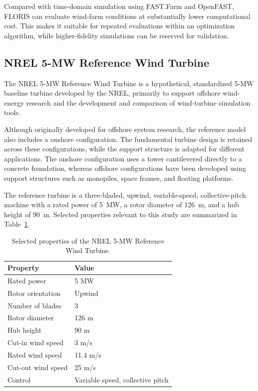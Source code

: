 \documentclass[11pt]{article}
\begin{document}
Compared with time-domain simulation using FAST.Farm and OpenFAST, FLORIS can evaluate wind-farm conditions at substantially lower computational cost. This makes it suitable for repeated evaluations within an optimization algorithm, while higher-fidelity simulations can be reserved for validation.



\subsection{NREL 5-MW Reference Wind Turbine}

The NREL 5-MW Reference Wind Turbine is a hypothetical, standardized 5-MW baseline turbine developed by the NREL, primarily to support offshore wind-energy research and the development and comparison of wind-turbine simulation tools.

Although originally developed for offshore system research, the reference model also includes a onshore configuration. The fundamental turbine design is retained across these configurations, while the support structure is adapted for different applications. The onshore configuration uses a tower cantilevered directly to a concrete foundation, whereas offshore configurations have been developed using support structures such as monopiles, space frames, and floating platforms.

The reference turbine is a three-bladed, upwind, variable-speed, collective-pitch machine with a rated power of 5~MW, a rotor diameter of 126~m, and a hub height of 90~m. Selected properties relevant to this study are summarized in Table~\ref{tab:nrel-5mw}.

\begin{table}[htbp]
    \centering
    \caption{Selected properties of the NREL 5-MW Reference Wind Turbine.}
    \label{tab:nrel-5mw}

    \begin{tabular}{ll}
        \toprule
        \textbf{Property} & \textbf{Value} \\
        \midrule
        Rated power       & 5 MW \\
        Rotor orientation & Upwind \\
        Number of blades  & 3 \\
        Rotor diameter    & 126 m \\
        Hub height        & 90 m \\
        Cut-in wind speed & 3 m/s \\
        Rated wind speed  & 11.4 m/s \\
        Cut-out wind speed & 25 m/s \\
        Control           & Variable speed, collective pitch \\
        \bottomrule
    \end{tabular}
\end{table}
\end{document}
